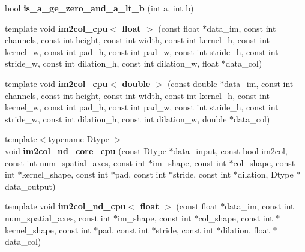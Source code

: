 \begin{DoxyCompactItemize}
\item 
bool {\bfseries is\+\_\+a\+\_\+ge\+\_\+zero\+\_\+and\+\_\+a\+\_\+lt\+\_\+b} (int a, int b)\hypertarget{namespacecaffe_a8173057750ece7bb5b6f09feb7f9039e}{}\label{namespacecaffe_a8173057750ece7bb5b6f09feb7f9039e}

\item 
template void {\bfseries im2col\+\_\+cpu$<$ float $>$} (const float $\ast$data\+\_\+im, const int channels, const int height, const int width, const int kernel\+\_\+h, const int kernel\+\_\+w, const int pad\+\_\+h, const int pad\+\_\+w, const int stride\+\_\+h, const int stride\+\_\+w, const int dilation\+\_\+h, const int dilation\+\_\+w, float $\ast$data\+\_\+col)\hypertarget{namespacecaffe_a6d9bca8fe0b3ab7bc2b9ce8883ac08e9}{}\label{namespacecaffe_a6d9bca8fe0b3ab7bc2b9ce8883ac08e9}

\item 
template void {\bfseries im2col\+\_\+cpu$<$ double $>$} (const double $\ast$data\+\_\+im, const int channels, const int height, const int width, const int kernel\+\_\+h, const int kernel\+\_\+w, const int pad\+\_\+h, const int pad\+\_\+w, const int stride\+\_\+h, const int stride\+\_\+w, const int dilation\+\_\+h, const int dilation\+\_\+w, double $\ast$data\+\_\+col)\hypertarget{namespacecaffe_a10d059c0dca7be3fe4289cd8efcba484}{}\label{namespacecaffe_a10d059c0dca7be3fe4289cd8efcba484}

\item 
{\footnotesize template$<$typename Dtype $>$ }\\void {\bfseries im2col\+\_\+nd\+\_\+core\+\_\+cpu} (const Dtype $\ast$data\+\_\+input, const bool im2col, const int num\+\_\+spatial\+\_\+axes, const int $\ast$im\+\_\+shape, const int $\ast$col\+\_\+shape, const int $\ast$kernel\+\_\+shape, const int $\ast$pad, const int $\ast$stride, const int $\ast$dilation, Dtype $\ast$data\+\_\+output)\hypertarget{namespacecaffe_a85bd5b073b9dce6e47dcc087f1241a14}{}\label{namespacecaffe_a85bd5b073b9dce6e47dcc087f1241a14}

\item 
template void {\bfseries im2col\+\_\+nd\+\_\+cpu$<$ float $>$} (const float $\ast$data\+\_\+im, const int num\+\_\+spatial\+\_\+axes, const int $\ast$im\+\_\+shape, const int $\ast$col\+\_\+shape, const int $\ast$kernel\+\_\+shape, const int $\ast$pad, const int $\ast$stride, const int $\ast$dilation, float $\ast$data\+\_\+col)\hypertarget{namespacecaffe_ae0569b98c2e1686987b78f0d8fd7401b}{}\label{namespacecaffe_ae0569b98c2e1686987b78f0d8fd7401b}


\end{DoxyCompactItemize}

